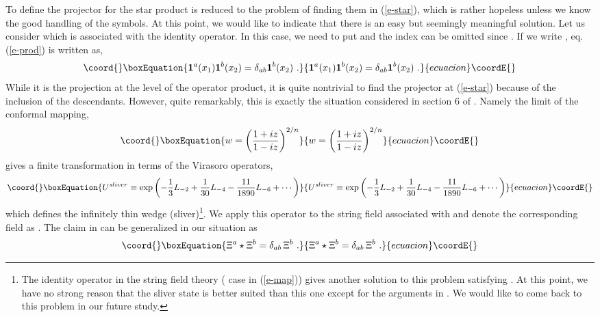 \documentclass[a4paper,12pt]{article}
\begin{document}
To define the projector for the star product is reduced to
the problem of finding them in (\ref{e-star}),
which is rather hopeless unless we know the good handling
of the \coordHE{} symbols. At this point, we would like to indicate
that there is an easy but seemingly meaningful solution. 
Let us consider \coordHE{} which is associated with 
the identity operator. In this case, we need to put
\coordHE{} and the index \myHighlight{$\alpha$}\coordHE{} can be
omitted since \coordHE{} .  If we write \coordHE{},
eq.(\ref{e-prod}) is written as,
\begin{equation}\coord{}\boxEquation{
 {\bf 1}^a(x_1){\bf 1}^b(x_2)= \delta_{ab}{\bf 1}^b(x_2)\,\,.
}{
 {\bf 1}^a(x_1){\bf 1}^b(x_2)= \delta_{ab}{\bf 1}^b(x_2)\,\,.
}{ecuacion}\coordE{}\end{equation}
While it is the projection at the level of the operator product,
it is quite nontrivial to find the projector at (\ref{e-star})
because of the inclusion of the descendants.
However, quite remarkably, this is exactly the situation considered
in section 6 of \cite{r-RZ}.  Namely the \coordHE{} limit
of the conformal mapping,
\begin{equation}\coord{}\boxEquation{\label{e-map}
 w=\left(\frac{1+iz}{1-iz}\right)^{2/n}
}{w=\left(\frac{1+iz}{1-iz}\right)^{2/n}
}{ecuacion}\coordE{}\end{equation}
gives a finite transformation in terms of the Virasoro operators,
\begin{equation}\coord{}\boxEquation{
U^{sliver}\equiv \exp\left(-\frac{1}{3}L_{-2}+\frac{1}{30}L_{-4}
-\frac{11}{1890}L_{-6}+\cdots\right)
}{
U^{sliver}\equiv \exp\left(-\frac{1}{3}L_{-2}+\frac{1}{30}L_{-4}
-\frac{11}{1890}L_{-6}+\cdots\right)
}{ecuacion}\coordE{}\end{equation}
which defines the infinitely thin wedge (sliver)\footnote{
The identity operator \coordHE{} in the string field theory 
(\coordHE{} case in (\ref{e-map})) gives another solution to this problem
satisfying
\coordHE{}.  At this point,
we have no strong reason that the sliver state is better suited
than  this one except for the arguments in \cite{r-RSZ1,r-RSZ2}. 
We would like to come back to this problem in our future study.}.
We apply this operator to the string field associated with 
\coordHE{} and denote the corresponding
field as \coordHE{}.  The claim in \cite{r-RZ} can be generalized 
in our situation as
\begin{equation}\coord{}\boxEquation{\label{e-Xi}
 \Xi^a\star\Xi^b=\delta_{ab}\,\Xi^b\,\,.
}{\Xi^a\star\Xi^b=\delta_{ab}\,\Xi^b\,\,.
}{ecuacion}\coordE{}\end{equation}
\end{document}
